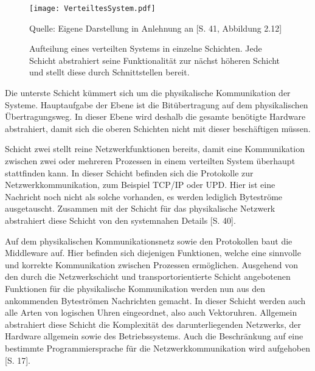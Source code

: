  \begin{figure}[ht]
 	\centering
 	\texttt{[image: VerteiltesSystem.pdf]}
 	\caption[Verteiltes System als Schichtemodell]{Aufteilung eines verteilten Systems in einzelne Schichten. Jede Schicht abstrahiert seine Funktionalität zur nächst höheren Schicht und stellt diese durch Schnittstellen bereit.}
 	Quelle: Eigene Darstellung in Anlehnung an \cite{schill12}[S. 41, Abbildung 2.12]
 	\label{figure:schichtenaufbau}
 \end{figure}
 
 Die unterste Schicht kümmert sich um die physikalische Kommunikation der Systeme. Hauptaufgabe der Ebene ist die Bitübertragung auf dem physikalischen Übertragungsweg. In dieser Ebene wird deshalb die gesamte benötigte Hardware abstrahiert, damit sich die oberen Schichten nicht mit dieser beschäftigen müssen. 
 
 Schicht zwei stellt reine Netzwerkfunktionen bereits, damit eine Kommunikation zwischen zwei oder mehreren Prozessen in einem verteilten System überhaupt stattfinden kann. In dieser Schicht befinden sich die Protokolle zur Netzwerkkommunikation, zum Beispiel TCP/IP oder UPD. Hier ist eine Nachricht noch nicht als solche vorhanden, es werden lediglich Byteströme ausgetauscht. Zusammen mit der Schicht für das physikalische Netzwerk abstrahiert diese Schicht von den systemnahen Details \cite{schill12}[S. 40].
 
 Auf dem physikalischen Kommunikationsnetz sowie den Protokollen baut die Middleware auf. Hier befinden sich diejenigen Funktionen, welche eine sinnvolle und korrekte Kommunikation zwischen Prozessen ermöglichen. Ausgehend von den durch die Netzwerkschicht und transportorientierte Schicht angebotenen Funktionen für die physikalische Kommunikation werden nun aus den ankommenden Byteströmen Nachrichten gemacht. In dieser Schicht werden auch alle Arten von logischen Uhren eingeordnet, also auch Vektoruhren. Allgemein abstrahiert diese Schicht die Komplexität des darunterliegenden Netzwerks, der Hardware allgemein sowie des Betriebssystems. Auch die Beschränkung auf eine bestimmte Programmiersprache für die Netzwerkkommunikation wird aufgehoben \cite{Coulouris2011}[S. 17].
 
